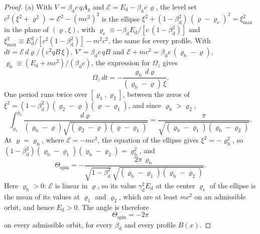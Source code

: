 \documentclass[aps,prd,onecolumn,tightenlines,nofootinbib,notitlepage,11pt,floatfix]{revtex4-2}
\theoremstyle{indentedtheorem}
\begin{document}
\begin{proof}
(a) With $V=\beta_\text{d}c\,qA_y$ and $\mathcal{E}=E_\text{d}-\beta_\text{d}c\,\varrho$, the level set $c^2(\xi^2+\varrho^2)=\mathcal{E}^2-(mc^2)^2$ is the ellipse $\xi^2+(1-\beta_\text{d}^2)\,(\varrho-\varrho_\text{e})^2=\xi_\text{max}^2$ in the plane of $(\varrho,\xi)$, with $\varrho_\text{e}\equiv-\beta_\text{d}E_\text{d}/[c\,(1-\beta_\text{d}^2)]$ and $\xi_\text{max}^2\equiv E_\text{d}^2/[c^2(1-\beta_\text{d}^2)]-m^2c^2$, the same for every profile. With $dt=\mathcal{E}\,d\varrho/(c^2qB\,\xi)$, $V'=\beta_\text{d}c\,qB$ and $\mathcal{E}+mc^2=\beta_\text{d}c\,(\varrho_\text{b}-\varrho)$, $\varrho_\text{b}\equiv(E_\text{d}+mc^2)/(\beta_\text{d}c)$, the expression for $\Omega_z$ gives
\begin{equation*}
    \Omega_z\,dt = -\frac{\varrho_\text{b}\,d\varrho}{(\varrho_\text{b}-\varrho)\,\xi} .
\end{equation*}
One period runs twice over $[\varrho_1,\varrho_2]$, between the zeros of $\xi^2=(1-\beta_\text{d}^2)(\varrho_2-\varrho)(\varrho-\varrho_1)$, and since $\varrho_\text{b}>\varrho_2$,
\begin{equation*}
    \int_{\varrho_1}^{\varrho_2}\frac{d\varrho}{(\varrho_\text{b}-\varrho)\sqrt{(\varrho_2-\varrho)(\varrho-\varrho_1)}} = \frac{\pi}{\sqrt{(\varrho_\text{b}-\varrho_1)(\varrho_\text{b}-\varrho_2)}} .
\end{equation*}
At $\varrho=\varrho_\text{b}$, where $\mathcal{E}=-mc^2$, the equation of the ellipse gives $\xi^2=-\varrho_\text{b}^2$, so $(1-\beta_\text{d}^2)(\varrho_\text{b}-\varrho_1)(\varrho_\text{b}-\varrho_2)=\varrho_\text{b}^2$, and
\begin{equation*}
    \Theta_\text{spin} = -\frac{2\pi\,\varrho_\text{b}}{\sqrt{1-\beta_\text{d}^2}\,\sqrt{(\varrho_\text{b}-\varrho_1)(\varrho_\text{b}-\varrho_2)}} .
\end{equation*}
Here $\varrho_\text{b}>0$: $\mathcal{E}$ is linear in $\varrho$, so its value $\gamma_\text{d}^2E_\text{d}$ at the center $\varrho_\text{e}$ of the ellipse is the mean of its values at $\varrho_1$ and $\varrho_2$, which are at least $mc^2$ on an admissible orbit, and hence $E_\text{d}>0$. The angle is therefore
\begin{equation*}
    \Theta_\text{spin} = -2\pi
\end{equation*}
on every admissible orbit, for every $\beta_\text{d}$ and every profile $B(x)$.


\end{proof}
\end{document}

